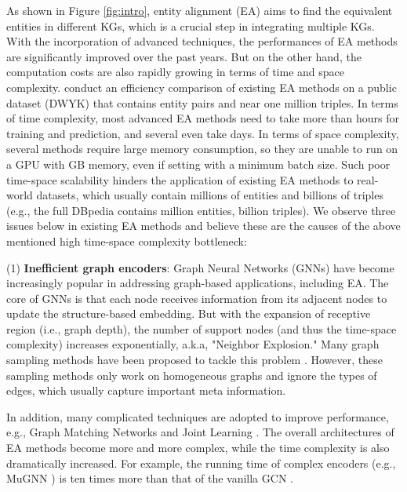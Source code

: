 \documentclass[sigconf]{acmart}
\begin{document}
As shown in Figure \ref{fig:intro}, entity alignment (EA) aims to find the equivalent entities in different KGs, which is a crucial step in integrating multiple KGs.
With the incorporation of advanced techniques, the performances of EA methods are significantly improved over the past years. 
But on the other hand, the computation costs are also rapidly growing in terms of time and space complexity.
\citet{9174835} conduct an efficiency comparison of existing EA methods on a public dataset (DWYK) that contains  entity pairs and near one million triples.
In terms of time complexity, most advanced EA methods \cite{DBLP:conf/icml/GuoSH19,DBLP:conf/ijcai/SunHZQ18,DBLP:conf/acl/CaoLLLLC19,DBLP:conf/emnlp/YangZSLLS19} need to take more than  hours for training and prediction, and several \cite{DBLP:conf/acl/XuWYFSWY19} even take days.
In terms of space complexity, several methods \cite{DBLP:conf/acl/CaoLLLLC19,DBLP:conf/ijcai/ZhuZ0TG19,DBLP:conf/emnlp/LiCHSLC19} require large memory consumption, so they are unable to run on a GPU with  GB memory, even if setting with a minimum batch size.
Such poor time-space scalability hinders the application of existing EA methods to real-world datasets, which usually contain millions of entities and billions of triples (e.g., the full DBpedia contains  million entities,  billion triples).
We observe three issues below in existing EA methods and believe these are the causes of the above mentioned high time-space complexity bottleneck:

(1) \textbf{Inefficient graph encoders}:
Graph Neural Networks (GNNs) have become increasingly popular in addressing graph-based applications, including EA. 
The core of GNNs is that each node receives information from its adjacent nodes to update the structure-based embedding.
But with the expansion of receptive region (i.e., graph depth), the number of support nodes (and thus the time-space complexity) increases exponentially, a.k.a, "Neighbor Explosion."
Many graph sampling methods have been proposed to tackle this problem \cite{DBLP:conf/iclr/ChenMX18,DBLP:conf/kdd/ChiangLSLBH19,DBLP:conf/iclr/ZengZSKP20}.
However, these sampling methods only work on homogeneous graphs and ignore the types of edges, which usually capture important meta information.

In addition, many complicated techniques are adopted to improve performance, e.g., Graph Matching Networks \cite{DBLP:conf/icml/LiGDVK19} and Joint Learning \cite{DBLP:conf/acl/CaoLLLLC19}. 
The overall architectures of EA methods become more and more complex, while the time complexity is also dramatically increased.
For example, the running time of complex encoders (e.g., MuGNN \cite{DBLP:conf/acl/CaoLLLLC19}) is ten times more than that of the vanilla GCN \cite{DBLP:conf/emnlp/WangLLZ18}.
\end{document}
